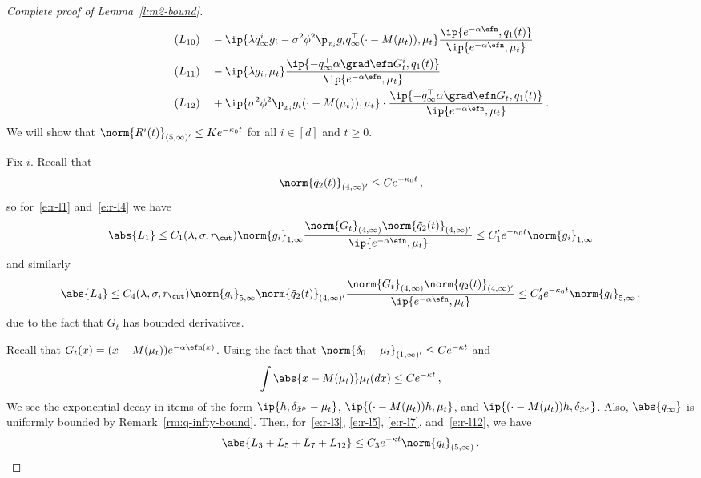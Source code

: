 \documentclass{amsart}
\begin{document}
\begin{proof}[Complete proof of Lemma~\ref{l:m2-bound}]
\begin{align}
		\label{e:r-l10} \tag{$L_{10}$}
		& \quad - \ip{\lambda q_\infty^i g_i - \sigma^2 \phi^2 \p_{x_i} g_i q_\infty^\top (\cdot-M(\mu_t)),\mu_t}  \frac{\ip{e^{-\alpha\efn}, q_1(t)}}{\ip{e^{-\alpha\efn}, \mu_t}} \\
		\label{e:r-l11} \tag{$L_{11}$}
		& \quad - \ip{\lambda g_i , \mu_t }  \frac{\ip{- q_\infty^\top \alpha \grad \efn G_t^i, q_1(t)}}{\ip{e^{-\alpha\efn},\mu_t}} \\
		\label{e:r-l12} \tag{$L_{12}$}
		& \quad + \ip{\sigma^2 \phi^2 \p_{x_i} g_i (\cdot-M(\mu_t)), \mu_t} \cdot \frac{\ip{- q_\infty^\top \alpha \grad \efn G_t, q_1(t)}}{\ip{e^{-\alpha\efn},\mu_t}}  \,.
	\end{align}
	We will show that $\norm{R^i(t)}_{(5,\infty)'} \le K e^{-\kappa_0 t}$ for all $i \in [d]$ and $t \ge 0$. 

	Fix $i$.
	Recall that 
	\begin{equation*}
		\norm{\tilde q_2(t)}_{(4,\infty)'} \le C e^{-\kappa_0 t} \,,
	\end{equation*}
	so for~\eqref{e:r-l1} and~\eqref{e:r-l4} we have 
	\begin{equation*}
		\abs{L_1} \le C_1(\lambda,\sigma,r_\cut) \norm{g_i}_{1,\infty} \frac{\norm{G_t}_{(4,\infty)} \norm{\tilde q_2(t)}_{(4,\infty)'}}{\ip{e^{-\alpha\efn}, \mu_t}} \le C_1' e^{-\kappa_0 t} \norm{g_i}_{1,\infty}
	\end{equation*}
	and similarly 
	\begin{equation*}
		\abs{L_4} \le C_4(\lambda,\sigma,r_\cut) \norm{g_i}_{5,\infty} \norm{\tilde q_2(t)}_{(4,\infty)'} \frac{\norm{G_t}_{(4,\infty)} \norm{q_2(t)}_{(4,\infty)'}}{\ip{e^{-\alpha\efn}, \mu_t}} \le C_4' e^{-\kappa_0 t} \norm{g_i}_{5,\infty} \,,
	\end{equation*}
	due to the fact that $G_t$ has bounded derivatives. 

	Recall that $G_t(x) = (x - M(\mu_t)) e^{-\alpha \efn(x)}$. 
    Using the fact that $\norm{\delta_0 - \mu_t}_{(1,\infty)'} \le C e^{-\kappa t}$ and
	\begin{equation*}
		\int \abs{x - M(\mu_t)} \mu_t(dx) \le C e^{-\kappa t} \,,
	\end{equation*}
	We see the exponential decay in items of the form $\ip{h, \delta_{\tilde x^\mu} - \mu_t}$, $\ip{(\cdot - M(\mu_t)) h, \mu_t}$, and $\ip{(\cdot - M(\mu_t)) h, \delta_{\tilde x^\mu}}$.
    Also, $\abs{q_\infty}$ is uniformly bounded by Remark~\ref{rm:q-infty-bound}.
    Then, for~\eqref{e:r-l3}, \eqref{e:r-l5}, \eqref{e:r-l7}, and~\eqref{e:r-l12}, we have
	\begin{equation*}
		\abs{L_3 + L_5 + L_7 + L_{12}} \le C_3 e^{-\kappa t} \norm{g_i}_{(5,\infty)} \,. 
	\end{equation*}


\end{proof}
\end{document}
